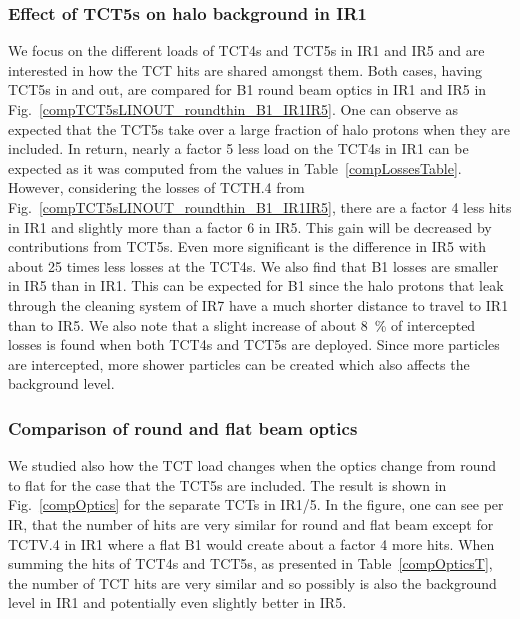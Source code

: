 \subsubsection{Effect of TCT5s on halo background in IR1}
We focus on the different loads of TCT4s and TCT5s in IR1 and IR5 and are interested in how the TCT hits are shared amongst them. Both cases, having TCT5s in and out, are compared for B1 round beam optics in IR1 and IR5 in Fig.~\ref{compTCT5sLINOUT_roundthin_B1_IR1IR5}. One can observe as expected that the TCT5s take over a large fraction of halo protons when they are included. In return, nearly a factor 5 less load on the TCT4s in IR1 can be expected as it was computed from the values in Table~\ref{compLossesTable}. However, considering the losses of TCTH.4 from Fig.~\ref{compTCT5sLINOUT_roundthin_B1_IR1IR5}, there are a factor 4 less hits in IR1 and slightly more than a factor 6 in IR5. This gain will be decreased by contributions from TCT5s. Even more significant is the difference in IR5 with about 25 times less losses at the TCT4s. We also find that B1 losses are smaller in IR5 than in IR1. This can be expected for B1 since the halo protons that leak through the cleaning system of IR7 have a much shorter distance to travel to IR1 than to IR5. We also note that a slight increase of about 8~\% of intercepted losses is found when both TCT4s and TCT5s are deployed. Since more particles are intercepted, more shower particles can be created which also affects the background level. %

\subsubsection{Comparison of round and flat beam optics}

We studied also how the TCT load changes when the optics change from round to flat for the case that the TCT5s are included. The result is shown in Fig.~\ref{compOptics} for the separate TCTs in IR1/5. In the figure, one can see per IR, that the number of hits are very similar for round and flat beam except for TCTV.4 in IR1 where a flat B1 would create about a factor 4 more hits. When summing the hits of TCT4s and TCT5s, as presented in Table~\ref{compOpticsT}, the number of TCT hits are very similar and so possibly is also the background level in IR1 and potentially even slightly better in IR5.

% 

